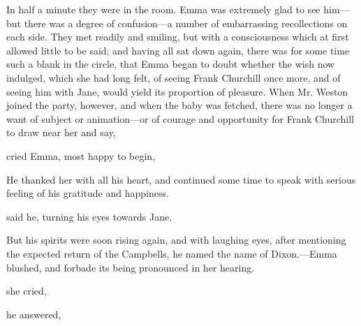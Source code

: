 In half a minute they were in the room. Emma was extremely glad to see him---but there was a degree of confusion---a number of embarrassing recollections on each side. They met readily and smiling, but with a consciousness which at first allowed little to be said; and having all sat down again, there was for some time such a blank in the circle, that Emma began to doubt whether the wish now indulged, which she had long felt, of seeing Frank Churchill once more, and of seeing him with Jane, would yield its proportion of pleasure. When Mr. Weston joined the party, however, and when the baby was fetched, there was no longer a want of subject or animation---or of courage and opportunity for Frank Churchill to draw near her and say,


 cried Emma, most happy to begin, 

He thanked her with all his heart, and continued some time to speak with serious feeling of his gratitude and happiness.

 said he, turning his eyes towards Jane. 

But his spirits were soon rising again, and with laughing eyes, after mentioning the expected return of the Campbells, he named the name of Dixon.---Emma blushed, and forbade its being pronounced in her hearing.

 she cried, 

 he answered, 



